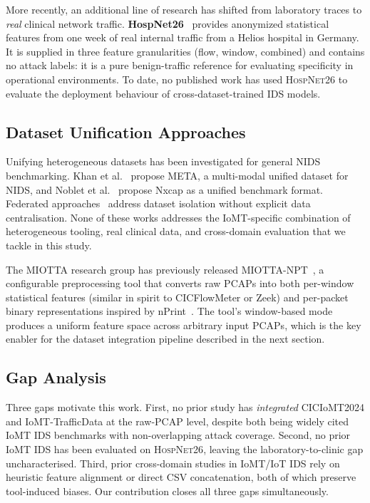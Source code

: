 \documentclass[runningheads]{llncs}
\begin{document}
More recently, an additional line of research has shifted from laboratory traces to \emph{real} clinical network traffic. \textbf{HospNet26}~\cite{hospnet26,Domenech2026_cbms} provides anonymized statistical features from one week of real internal traffic from a Helios hospital in Germany. It is supplied in three feature granularities (flow, window, combined) and contains no attack labels: it is a pure benign-traffic reference for evaluating specificity in operational environments. To date, no published work has used \textsc{HospNet26} to evaluate the deployment behaviour of cross-dataset-trained IDS models.

\subsection{Dataset Unification Approaches}

Unifying heterogeneous datasets has been investigated for general NIDS benchmarking. Khan et al.~\cite{khan2024umnids} propose META, a multi-modal unified dataset for NIDS, and Noblet et al.~\cite{noblet2025nxcap} propose Nxcap as a unified benchmark format. Federated approaches~\cite{abouhouran2025federated} address dataset isolation without explicit data centralisation. None of these works addresses the IoMT-specific combination of heterogeneous tooling, real clinical data, and cross-domain evaluation that we tackle in this study.

The MIOTTA research group has previously released MIOTTA-NPT~\cite{leon2025miotta,miotta_npt_github}, a configurable preprocessing tool that converts raw PCAPs into both per-window statistical features (similar in spirit to CICFlowMeter or Zeek) and per-packet binary representations inspired by nPrint~\cite{holland2021nprint}. The tool's window-based mode produces a uniform feature space across arbitrary input PCAPs, which is the key enabler for the dataset integration pipeline described in the next section.

\subsection{Gap Analysis}

Three gaps motivate this work. First, no prior study has \emph{integrated} CICIoMT2024 and IoMT-TrafficData at the raw-PCAP level, despite both being widely cited IoMT IDS benchmarks with non-overlapping attack coverage. Second, no prior IoMT IDS has been evaluated on \textsc{HospNet26}, leaving the laboratory-to-clinic gap uncharacterised. Third, prior cross-domain studies in IoMT/IoT IDS rely on heuristic feature alignment or direct CSV concatenation, both of which preserve tool-induced biases. Our contribution closes all three gaps simultaneously.
\end{document}
